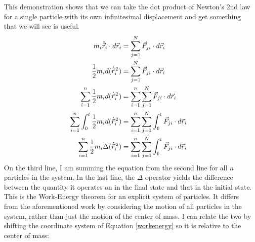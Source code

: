 \documentclass[10pt]{article}
\begin{document}
This demonstration shows that we can take the dot product of Newton's 2nd 
law for a single particle with its own infinitesimal displacement and get 
something that we will see is useful.
\begin{align}
    m_i\ddot{\vec{r}}_i\cdot d\vec{r}_i &= 
        \sum_{j=1}^N\vec{F}_{ji}\cdot d\vec{r}_i \notag\\
    \frac{1}{2}m_id(\dot{\vec{r}}_i^{\,2}) &= 
        \sum_{j=1}^N\vec{F}_{ji}\cdot d\vec{r}_i \notag\\
    \sum_{i=1}^n \frac{1}{2}m_id(\dot{\vec{r}}_i^{\,2}) &= 
        \sum_{i=1}^n \sum_{j=1}^N\vec{F}_{ji}\cdot d\vec{r}_i \notag\\
    \sum_{i=1}^n \int_{0}^{t} \frac{1}{2}m_id(\dot{\vec{r}}_i^{\,2}) &= 
        \sum_{i=1}^n \sum_{j=1}^N \int_{0}^{t} \vec{F}_{ji}\cdot d\vec{r}_i 
        \notag\\
    \sum_{i=1}^n \frac{1}{2}m_i\Delta(\dot{\vec{r}}_i^{\,2}) &= 
        \sum_{i=1}^n \sum_{j=1}^N \int_{0}^{t} \vec{F}_{ji}\cdot d\vec{r}_i 
        \label{workenergy}
\end{align}
On the third line, I am summing the equation from the second line for 
all $n$ particles in the system. In the last line, the 
$\Delta$ operator yields the difference between the quantity it operates 
on in the final state and that in the initial state. This is 
the Work-Energy theorem for an explicit system of particles. It differs 
from the aforementioned work by considering the motion of all 
particles in the system, rather than just the motion of 
the center of mass. I can relate the two by shifting 
the coordinate system of Equation \ref{workenergy} 
so it is relative to the center of mass:
\end{document}
